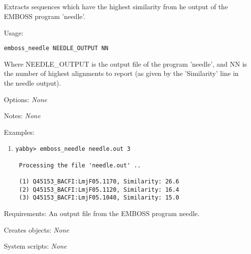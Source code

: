 

\subsection[emboss\_needle]{  }



Extracts sequences which have the highest similarity from
he output of the EMBOSS program 'needle'.


\begin{description}


\item{Usage:}

{\tt emboss\_needle NEEDLE\_OUTPUT NN}

  Where NEEDLE\_OUTPUT is the output file of the program 'needle',
  and NN is the number of highest alignments to report (as given
  by the 'Similarity' line in the needle output).


\item{Options:} {\em None}


\item{Notes:} {\em None}


\item{Examples:}
\begin{enumerate}

\item
\begin{verbatim}
yabby> emboss_needle needle.out 3

 Processing the file 'needle.out' ..

 (1) Q45153_BACFI:LmjF05.1170, Similarity: 26.6
 (2) Q45153_BACFI:LmjF05.1120, Similarity: 16.4
 (3) Q45153_BACFI:LmjF05.1040, Similarity: 15.0

\end{verbatim}

\end{enumerate}


\item{Requirements:} An output file from the EMBOSS program needle.


\item{Creates objects:} {\em None}


\item{System scripts:} {\em None}

\end{description}

